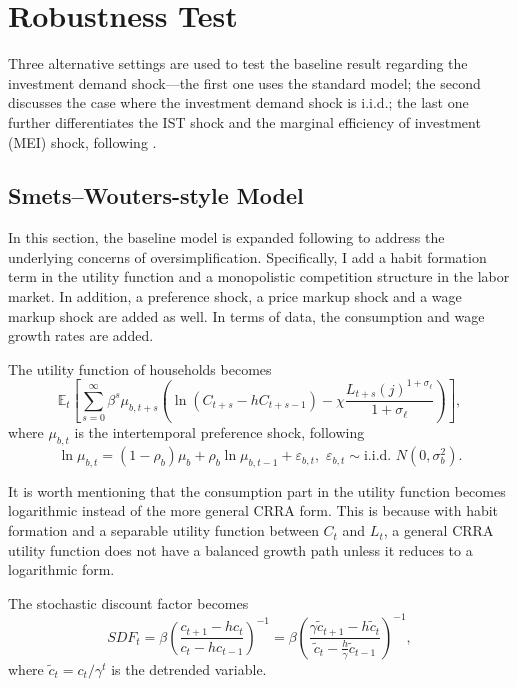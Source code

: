 \section{Robustness Test}
\label{sec:robustness}
Three alternative settings are used to test the baseline result regarding the investment demand shock---the first one uses the standard \cite{smetsShocksFrictionsUS2007} model; the second discusses the case where the investment demand shock is i.i.d.; the last one further differentiates the IST shock and the marginal efficiency of investment (MEI) shock, following \cite{justinianoInvestmentShocksRelative2011}.

\subsection{Smets--Wouters-style Model}
\label{sec:robustness:sw}
In this section, the baseline model is expanded following \cite{smetsShocksFrictionsUS2007} to address the underlying concerns of oversimplification. Specifically, I add a habit formation term in the utility function and a monopolistic competition structure in the labor market. In addition, a preference shock, a price markup shock and a wage markup shock are added as well. In terms of data, the consumption and wage growth rates are added.

The utility function of households becomes
\begin{equation}
    \mathbb{E}_t \left[ \sum_{s=0}^{\infty} \beta^s \mu_{b, t+s} \left( \ln(C_{t+s} - h C_{t+s-1}) - \chi \frac{L_{t+s}(j)^{1+\sigma_\ell}}{1+\sigma_\ell} \right) \right],
\end{equation}
where $\mu_{b, t}$ is the intertemporal preference shock, following
\begin{equation}
    \ln \mu_{b, t} = (1 - \rho_b) \mu_b + \rho_b \ln \mu_{b, t-1} + \varepsilon_{b, t}, \,\, \varepsilon_{b, t}\sim \text{i.i.d. } N (0, \sigma_b^2).
\end{equation}

It is worth mentioning that the consumption part in the utility function becomes logarithmic instead of the more general CRRA form. This is because with habit formation and a separable utility function between $C_t$ and $L_t$, a general CRRA utility function does not have a balanced growth path unless it reduces to a logarithmic form.

The stochastic discount factor becomes
\begin{equation}
    SDF_t = \beta \left(\frac{c_{t+1} - hc_t}{c_t - hc_{t-1}}\right)^{-1} = \beta \left(\frac{\gamma \tilde{c}_{t+1} - h\tilde{c}_t}{\tilde{c}_t - \frac{h}{\gamma}\tilde{c}_{t-1}}\right)^{-1},
\end{equation}
where $\tilde{c}_t = c_t / \gamma^t$ is the detrended variable.

